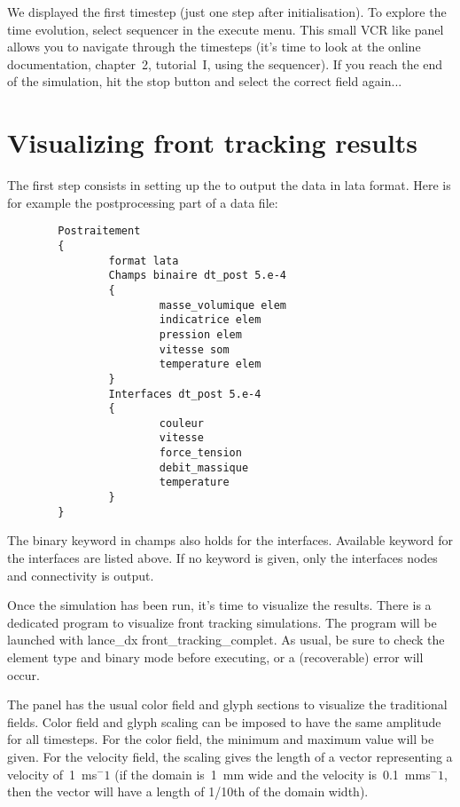 \documentclass[a4paper,10pt,dvips]{article}
\begin{document}
We displayed the first timestep (just one step after initialisation).
To explore the time evolution, select \textsf{sequencer} in the \textsf{execute}
menu. This small VCR like panel allows you to navigate through the timesteps
(it's time to look at the online documentation, chapter~2, tutorial~I,
using the sequencer). If you reach the end of the simulation, hit the
stop button and select the correct field again...

\section{Visualizing front tracking results}

The first step consists in setting up the \triou to output the data in
\textsf{lata} format. Here is for example the postprocessing part of a data file:

\begin{verbatim}
        Postraitement
        {
                format lata
                Champs binaire dt_post 5.e-4
                {
                        masse_volumique elem
                        indicatrice elem
                        pression elem
                        vitesse som
                        temperature elem
                }
                Interfaces dt_post 5.e-4
                {
                        couleur
                        vitesse
                        force_tension
                        debit_massique
                        temperature
                }
        }
\end{verbatim}

The \textsf{binary} keyword in \textsf{champs} also holds for the interfaces.
Available keyword for the interfaces are listed above. If no keyword is given,
only the interfaces nodes and connectivity is output.

Once the simulation has been run, it's time to visualize the results.
There is a dedicated program to visualize front tracking simulations.
The program will be launched with \textsf{lance\_dx front\_tracking\_complet}.
As usual, be sure to check the element type and binary mode before executing,
or a (recoverable) error will occur.

The panel has the usual color field and glyph sections to visualize the
traditional fields. Color field and glyph scaling can be imposed to
have the same amplitude for all timesteps. For the color field, the minimum
and maximum value will be given. For the velocity field, the scaling gives
the length of a vector representing a velocity of~1~ms$^-1$ (if the domain
is~1~mm wide and the velocity is~0.1~mms$^-1$, then the vector will have a
length of 1/10th of the domain width).
\end{document}
